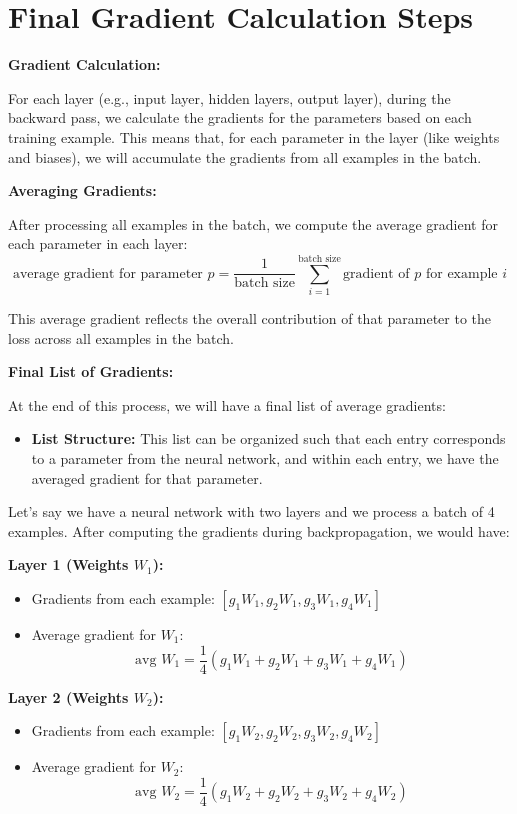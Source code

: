 \documentclass{article}
\begin{document}
\section{Final Gradient Calculation Steps}
\textbf{Gradient Calculation:}

For each layer (e.g., input layer, hidden layers, output layer), during the backward pass, we calculate the gradients for the parameters based on each training example. This means that, for each parameter in the layer (like weights and biases), we will accumulate the gradients from all examples in the batch.

\textbf{Averaging Gradients:}

After processing all examples in the batch, we compute the average gradient for each parameter in each layer:
\[
\text{average gradient for parameter } p = \frac{1}{\text{batch size}} \sum_{i=1}^{\text{batch size}} \text{gradient of } p \text{ for example } i
\]

This average gradient reflects the overall contribution of that parameter to the loss across all examples in the batch.

\textbf{Final List of Gradients:}

At the end of this process, we will have a final list of average gradients:
\begin{itemize}
    \item \textbf{List Structure:} This list can be organized such that each entry corresponds to a parameter from the neural network, and within each entry, we have the averaged gradient for that parameter.
\end{itemize}

Let’s say we have a neural network with two layers and we process a batch of 4 examples. After computing the gradients during backpropagation, we would have:

\textbf{Layer 1 (Weights \(W_1\)):}
\begin{itemize}
    \item Gradients from each example: \([g_1 W_1, g_2 W_1, g_3 W_1, g_4 W_1]\)
    \item Average gradient for \(W_1\):
    \[
    \text{avg } W_1 = \frac{1}{4}(g_1 W_1 + g_2 W_1 + g_3 W_1 + g_4 W_1)
    \]
\end{itemize}
\textbf{Layer 2 (Weights \(W_2\)):}
\begin{itemize}
    \item Gradients from each example: \([g_1 W_2, g_2 W_2, g_3 W_2, g_4 W_2]\)
    \item Average gradient for \(W_2\):
    \[
    \text{avg } W_2 = \frac{1}{4}(g_1 W_2 + g_2 W_2 + g_3 W_2 + g_4 W_2)
    \]
\end{itemize}
\end{document}
